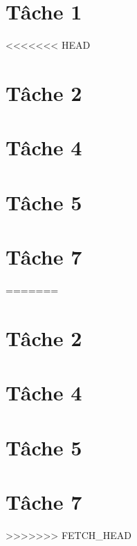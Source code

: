 \documentclass[a4paper,oneside,12pt]{report}
\begin{document}


\tableofcontents

\chapter{T\^ache 1}
<<<<<<< HEAD


\chapter{T\^ache 2}


\chapter{T\^ache 4}


\chapter{T\^ache 5}


\chapter{T\^ache 7}

=======


\chapter{T\^ache 2}


\chapter{T\^ache 4}


\chapter{T\^ache 5}


\chapter{T\^ache 7}

>>>>>>> FETCH_HEAD

\printbibliography
\end{document}
